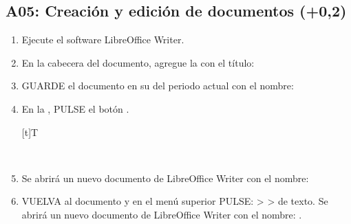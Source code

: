 \documentclass[letterpaper,10pt,spanish]{sphinxmanual}
\let\sphinxpxdimen\pdfpxdimen\else\newdimen\sphinxpxdimen
\begin{document}
\subsection{A05: Creación y edición de documentos  (+0,2)}
\label{\detokenize{1_guias/10ofimatica/G1013:a05-creacion-y-edicion-de-documentos-111-0-2}}
\sphinxAtStartPar
{}
\begin{enumerate}
%
\item {} 
\sphinxAtStartPar
Ejecute el software LibreOffice Writer.

\item {} 
\sphinxAtStartPar
En la cabecera del documento, agregue la  con el título: 

\item {} 
\sphinxAtStartPar
GUARDE el documento en su  del periodo actual con el nombre: 

\item {} 
\sphinxAtStartPar
En la , PULSE el botón .


\begin{savenotes}\sphinxattablestart
\sphinxthistablewithglobalstyle
\centering
\begin{tabulary}{\linewidth}[t]{T}
\sphinxtoprule
\sphinxtableatstartofbodyhook

\begin{sphinxfigure-in-table}
\centering

\noindent\sphinxincludegraphics[width=50\sphinxpxdimen]{{image151}.png}
\end{sphinxfigure-in-table}\relax
\\
\sphinxbottomrule
\end{tabulary}
\sphinxtableafterendhook\par
\sphinxattableend\end{savenotes}

\item {} 
\sphinxAtStartPar
Se abrirá un nuevo documento de LibreOffice Writer con el nombre: 

\item {} 
\sphinxAtStartPar
VUELVA al documento  y en el menú superior PULSE:  >  >  de texto. Se abrirá un nuevo documento de LibreOffice Writer con el nombre: .


\end{enumerate}
\end{document}
